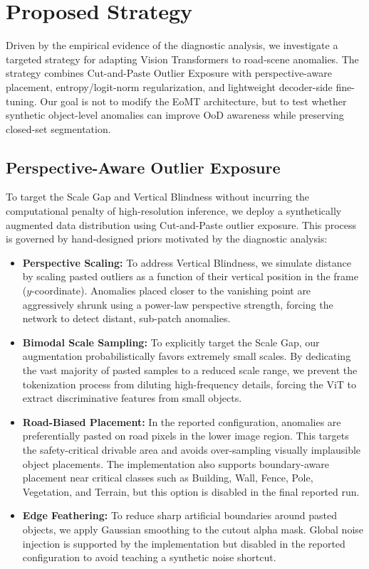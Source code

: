 \section{Proposed Strategy}
\label{sec:strategy}

Driven by the empirical evidence of the diagnostic analysis, we investigate a targeted strategy for adapting Vision Transformers to road-scene anomalies. The strategy combines Cut-and-Paste Outlier Exposure with perspective-aware placement, entropy/logit-norm regularization, and lightweight decoder-side fine-tuning. Our goal is not to modify the EoMT architecture, but to test whether synthetic object-level anomalies can improve OoD awareness while preserving closed-set segmentation.

\subsection{Perspective-Aware Outlier Exposure}

To target the Scale Gap and Vertical Blindness without incurring the computational penalty of high-resolution inference, we deploy a synthetically augmented data distribution using Cut-and-Paste outlier exposure. This process is governed by hand-designed priors motivated by the diagnostic analysis:

\begin{itemize}
    \item \textbf{Perspective Scaling:} To address Vertical Blindness, we simulate distance by scaling pasted outliers as a function of their vertical position in the frame ($y$-coordinate). Anomalies placed closer to the vanishing point are aggressively shrunk using a power-law perspective strength, forcing the network to detect distant, sub-patch anomalies.
    
    \item \textbf{Bimodal Scale Sampling:} To explicitly target the Scale Gap, our augmentation probabilistically favors extremely small scales. By dedicating the vast majority of pasted samples to a reduced scale range, we prevent the tokenization process from diluting high-frequency details, forcing the ViT to extract discriminative features from small objects.
    
    \item \textbf{Road-Biased Placement:} In the reported configuration, anomalies are preferentially pasted on road pixels in the lower image region. This targets the safety-critical drivable area and avoids over-sampling visually implausible object placements. The implementation also supports boundary-aware placement near critical classes such as Building, Wall, Fence, Pole, Vegetation, and Terrain, but this option is disabled in the final reported run.
    
    \item \textbf{Edge Feathering:} To reduce sharp artificial boundaries around pasted objects, we apply Gaussian smoothing to the cutout alpha mask. Global noise injection is supported by the implementation but disabled in the reported configuration to avoid teaching a synthetic noise shortcut.
\end{itemize}

